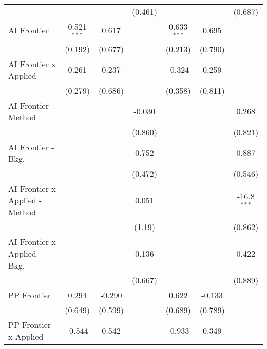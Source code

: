 \begin{tabular}{lcccccc}
                                  &               &               & (0.461)       &               &               & (0.687)\\   
   AI Frontier                    & 0.521$^{***}$ & 0.617         &               & 0.633$^{***}$ & 0.695         &   \\   
                                  & (0.192)       & (0.677)       &               & (0.213)       & (0.790)       &   \\   
   AI Frontier x Applied          & 0.261         & 0.237         &               & -0.324        & 0.259         &   \\   
                                  & (0.279)       & (0.686)       &               & (0.358)       & (0.811)       &   \\   
   AI Frontier - Method           &               &               & -0.030        &               &               & 0.268\\   
                                  &               &               & (0.860)       &               &               & (0.821)\\   
   AI Frontier - Bkg.             &               &               & 0.752         &               &               & 0.887\\   
                                  &               &               & (0.472)       &               &               & (0.546)\\   
   AI Frontier x Applied - Method &               &               & 0.051         &               &               & -16.8$^{***}$\\   
                                  &               &               & (1.19)        &               &               & (0.862)\\   
   AI Frontier x Applied - Bkg.   &               &               & 0.136         &               &               & 0.422\\   
                                  &               &               & (0.667)       &               &               & (0.889)\\   
   PP Frontier                    & 0.294         & -0.290        &               & 0.622         & -0.133        &   \\   
                                  & (0.649)       & (0.599)       &               & (0.689)       & (0.789)       &   \\   
   PP Frontier x Applied          & -0.544        & 0.542         &               & -0.933        & 0.349         &   \\   

\end{tabular}
